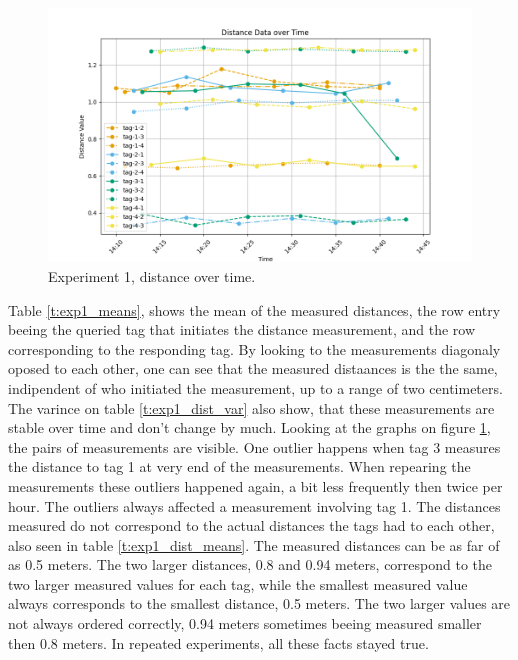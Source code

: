 \begin{figure}[ht!]
	\includegraphics[width=\linewidth]{graphics/exp/exp1_dist_data_plot_0.png}
	\caption{Experiment 1, distance over time.}
	\label{f:exp1_graphs_dist}
\end{figure}

Table \ref{t:exp1_means}, shows the mean of the measured distances, the row entry beeing the queried tag that initiates the distance measurement, and the row corresponding to the responding tag.
By looking to the measurements diagonaly oposed to each other, one can see that the measured distaances is the the same, indipendent of who initiated the measurement, up to a range of two centimeters.
The varince on table \ref{t:exp1_dist_var} also show, that these measurements are stable over time and don't change by much.
Looking at the graphs on figure \ref{f:exp1_graphs_dist}, the pairs of measurements are visible.
One outlier happens when tag 3 measures the distance to tag 1 at very end of the measurements.
When repearing the measurements these outliers happened again, a bit less frequently then twice per hour.
The outliers always affected a measurement involving tag 1.
The distances measured do not correspond to the actual distances the tags had to each other, also seen in table \ref{t:exp1_dist_means}.
The measured distances can be as far of as 0.5 meters.
The two larger distances, 0.8 and 0.94 meters, correspond to the two larger measured values for each tag, while the smallest measured value always corresponds to the smallest distance, 0.5 meters.
The two larger values are not always ordered correctly, 0.94 meters sometimes beeing measured smaller then 0.8 meters.
In repeated experiments, all these facts stayed true.

